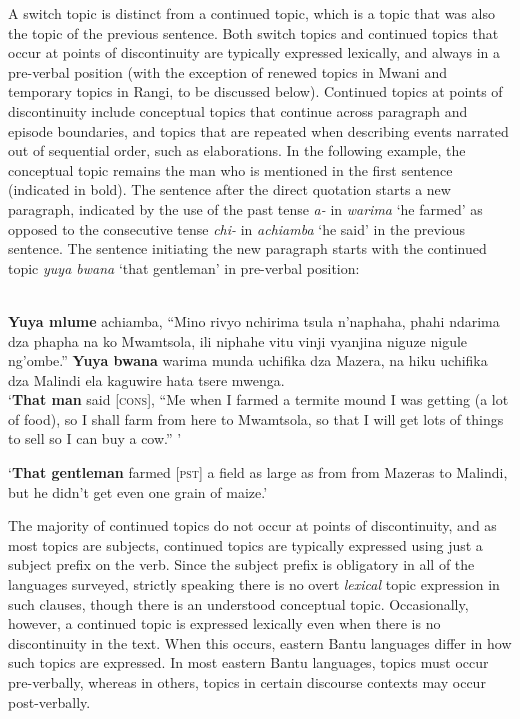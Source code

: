 \documentclass[output=paper]{langsci/langscibook}
\begin{document}
A switch topic is distinct from a continued topic, which is a topic that was also the topic of the previous sentence. Both switch topics and continued topics that occur at points of discontinuity are typically expressed lexically, and always in a pre-verbal position (with the exception of renewed topics in Mwani and temporary topics in Rangi, to be discussed below). Continued topics at points of discontinuity include conceptual topics that continue across paragraph and episode boundaries, and topics that are repeated when describing events narrated out of sequential order, such as elaborations. In the following example, the conceptual topic remains the man who is mentioned in the first sentence (indicated in bold). The sentence after the direct quotation starts a new paragraph, indicated by the use of the past tense \textit{a-} in \textit{warima} ‘he farmed’ as opposed to the consecutive tense \textit{chi-} in \textit{achiamba} ‘he said’ in the previous sentence. The sentence initiating the new paragraph starts with the continued topic \textit{yuya bwana} ‘that gentleman’ in pre-verbal position:

\ea\label{ex:8.nicolle}
\\
  \textbf{Yuya mlume} achiamba, “Mino rivyo nchirima tsula n’naphaha, phahi ndarima dza phapha na ko Mwamtsola, ili niphahe vitu vinji vyanjina niguze nigule ng'ombe.” \textbf{Yuya bwana} warima munda uchifika dza Mazera, na hiku uchifika dza Malindi ela kaguwire hata tsere mwenga.\\
\glt `\textbf{That man} said [\textsc{cons}], “Me when I farmed a termite mound I was getting (a lot of food), so I shall farm from here to Mwamtsola, so that I will get lots of things to sell so I can buy a cow.” '

`\textbf{That gentleman} farmed [\textsc{pst}] a field as large as from from Mazeras to Malindi, but he didn’t get even one grain of maize.’
\z

The majority of continued topics do not occur at points of discontinuity, and as most topics are subjects, continued topics are typically expressed using just a subject prefix on the verb. Since the subject prefix is obligatory in all of the languages surveyed, strictly speaking there is no overt \textit{lexical} topic expression in such clauses, though there is an understood conceptual topic. Occasionally, however, a continued topic is expressed lexically even when there is no discontinuity in the text. When this occurs, eastern Bantu languages differ in how such topics are expressed. In most eastern Bantu languages, topics must occur pre-verbally, whereas in others, topics in certain discourse contexts may occur post-verbally.
\end{document}
